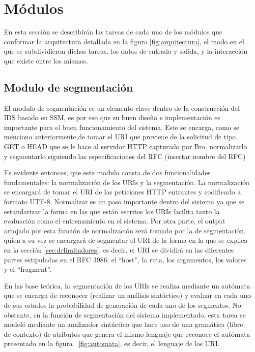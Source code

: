 \section{Módulos}

En esta sección se describirán las tareas de cada uno de los módulos que conformar la arquitectura detallada en la figura \ref{fig:arquitectura}, el modo en el que se subdividieron dichas tareas, los datos de entrada y salida, y la interacción que existe entre los mismos.

\subsection{Modulo de segmentación}

El modulo de segmentación es un elemento clave dentro de la construcción del IDS basado en SSM, es por eso que su buen diseño e implementación es importante para el buen funcionamiento del sistema. Este se encarga, como se menciono anteriormente,de tomar el URI que proviene de la solicitud de tipo GET o HEAD que se le hace al servidor HTTP capturado por Bro, normalizarlo y segmentarlo siguiendo las especificaciones del RFC (insertar nombre del RFC) 

Es evidente entonces, que este modulo consta de dos funcionalidades fundamentales: la normalización de los URIs y la segmentación.  La normalización se encargará de tomar el URI de las peticiones HTTP entrantes y codificarlo a formato UTF-8. Normalizar es un paso importante dentro del sistema  ya que se estandarizar la forma en las que están escritos los URIs facilita tanto la evaluación como el entrenamiento en el sistema. Por otra parte, el output arrojado por esta función de normalización será tomado por la de segmentación, quien a su vez se encargará de segmentar el URI de la forma en la que se explica en la sección \ref{sec:delimitadores}, es decir, el URI se dividirá en las diferentes partes estipuladas en el RFC 3986: el ``host'', la ruta, los argumentos, los valores y el ``fragment''.

 En las base teórica, la segmentación de los URIs se realiza mediante un autómata que se encarga de reconocer (realizar un análisis sintáctico) y evaluar en cada uno de sus estados la probabilidad de generación de cada uno de los segmentos.  No obstante, en la función de segmentación del sistema implementado, esta tarea se modeló mediante un analizador sintáctico que hace uso de una gramática (libre de contexto) de atributos que genera el mismo lenguaje que reconoce el autómata presentado en la figura ~\ref{fig:automata}, es decir, el lenguaje de los URI.

